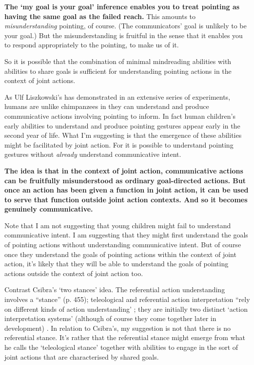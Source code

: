 \documentclass[12pt,a4paper]{extarticle}
\begin{document}
\textbf{The `my goal is your goal' inference enables you to treat pointing as having the same goal as the failed reach.}
This amounts to \emph{misunderstanding} pointing, of course.  
(The communicators' goal is unlikely to be your goal.)
But the misunderstanding is fruitful in the sense that it enables you to respond appropriately to the pointing, to make us of it.

So it is possible that the combination of minimal mindreading abilities with abilities to share goals is sufficient for understanding pointing actions in the context of joint actions.

As Ulf Liszkowski's has demonstrated in an extensive series of experiments, humans are unlike chimpanzees in they can understand and produce communicative actions involving pointing to inform.
In fact human children's early abilities to understand and produce pointing gestures appear early in the second year of life.
What I'm suggesting is that the emergence of these abilities might be facilitated by joint action.
For it is possible to understand pointing gestures without \emph{already} understand communicative intent.

\textbf{
The idea is that in the context of joint action, communicative actions can be fruitfully misunderstood as ordinary goal-directed actions.
But once an action has been given a function in joint action, it can be used to serve that function outside joint action contexts.  And so it becomes genuinely communicative.
}

Note that I am not suggesting that young children might fail to understand communicative intent.
I am suggesting that they might first understand the goals of pointing actions without understanding communicative intent.
But of course once they understand the goals of pointing actions within the context of joint action, it's likely that they will be able to understand the goals of pointing actions outside the context of joint action too.

Contrast Csibra's `two stances' idea. The referential action understanding involves a “stance” (p. 455); teleological and referential action interpretation “rely on different kinds of action understanding' \citep[p.\ 456]{Csibra:2003kp}; they are initially two distinct `action interpretation systems' (although of course they come together later in development)  \citep[p.\ 456]{Csibra:2003kp}.
In relation to Csibra's, my suggestion is not that there is no referential stance.
It's rather that the referential stance might emerge from what he calls the `teleological stance' together with abilities to engage in the sort of joint actions that are characterised by shared goals.
\end{document}
